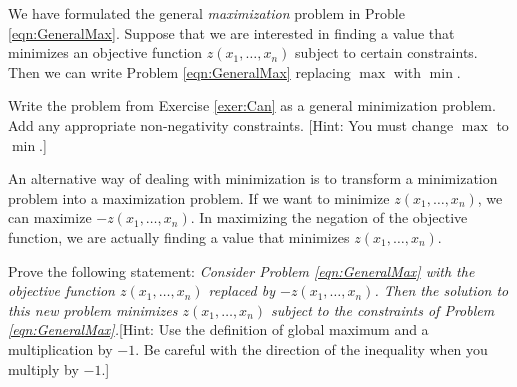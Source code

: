 We have formulated the general \textit{maximization} problem in Proble \ref{eqn:GeneralMax}. Suppose that we are interested in finding a value that minimizes an objective function $z(x_1,\dots,x_n)$ subject to certain constraints. Then we can write Problem \ref{eqn:GeneralMax} replacing $\max$ with $\min$. 

\begin{exercise} Write the problem from Exercise \ref{exer:Can} as a general minimization problem. Add any appropriate non-negativity constraints. [Hint: You must change $\max$ to $\min$.] 
\end{exercise}

An alternative way of dealing with minimization is to transform a minimization problem into a maximization problem. If we want to minimize $z(x_1,\dots,x_n)$, we can maximize $-z(x_1,\dots,x_n)$. In maximizing the negation of the objective function, we are actually finding a value that minimizes $z(x_1,\dots,x_n)$.

\begin{exercise} Prove the following statement:
\textit{Consider Problem \ref{eqn:GeneralMax} with the objective function $z(x_1,\dots,x_n)$ replaced by $-z(x_1,\dots,x_n)$. Then the solution to this new problem minimizes $z(x_1,\dots,x_n)$ subject to the constraints of Problem \ref{eqn:GeneralMax}.}[Hint: Use the definition of global maximum and a multiplication by $-1$. Be careful with the direction of the inequality when you multiply by $-1$.]
\label{exer:MinForMax}
\end{exercise}

